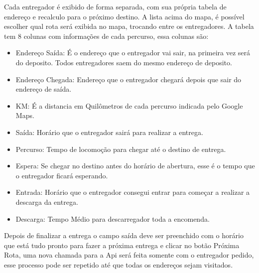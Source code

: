 \begin{center}
	\label{fig:InterfaceResultado}
\end{center}

Cada entregador é exibido de forma separada, com sua própria tabela de endereço e recalculo para o próximo destino. A lista acima do mapa, é possível escolher qual rota será exibida no mapa, trocando entre os entregadores.
A tabela tem 8 colunas com informações de cada percurso, essa colunas são:
\begin{itemize}
	\item Endereço Saída: É o endereço que o entregador vai sair, na primeira vez será do deposito. Todos entregadores saem do mesmo endereço de deposito.
	\item Endereço Chegada: Endereço que o entregador chegará depois que sair do endereço de saída.
	\item KM: É a distancia em Quilômetros de cada percurso indicada pelo Google Maps.
	\item Saída: Horário que o entregador sairá para realizar a entrega.
	\item Percurso: Tempo de locomoção para chegar até o destino de entrega.
	\item Espera: Se chegar no destino antes do horário de abertura, esse é o tempo que o entregador ficará esperando.
	\item Entrada: Horário que o entregador consegui entrar para começar a realizar a descarga da entrega.
	\item Descarga: Tempo Médio para descarregador toda a encomenda.
\end{itemize}
Depois de finalizar a entrega o campo saída deve ser preenchido com o horário que está tudo pronto para fazer a próxima entrega e clicar no botão Próxima Rota, uma nova chamada para a Api será feita somente com o entregador pedido, esse processo pode ser repetido até que todas os endereços sejam visitados.
